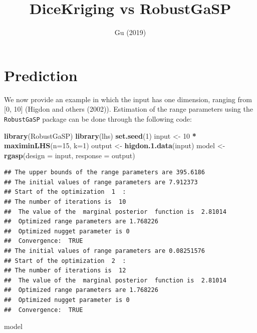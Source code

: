 \documentclass[
  10pt,
]{article}
\title{DiceKriging vs RobustGaSP}
\author{}
\date{\vspace{-2.5em}Gu (2019)}
\newenvironment{Shaded}{\begin{snugshade}}{\end{snugshade}}
\newcommand{\AttributeTok}[1]{\textcolor[rgb]{0.13,0.29,0.53}{#1}}
\newcommand{\DecValTok}[1]{\textcolor[rgb]{0.00,0.00,0.81}{#1}}
\newcommand{\FunctionTok}[1]{\textcolor[rgb]{0.13,0.29,0.53}{\textbf{#1}}}
\newcommand{\NormalTok}[1]{#1}
\newcommand{\OtherTok}[1]{\textcolor[rgb]{0.56,0.35,0.01}{#1}}
\newcommand{\SpecialCharTok}[1]{\textcolor[rgb]{0.81,0.36,0.00}{\textbf{#1}}}
\begin{document}
\maketitle

\section{Prediction}\label{prediction}

We now provide an example in which the input has one dimension, ranging
from {[}0, 10{]} (Higdon and others (2002)). Estimation of the range
parameters using the \texttt{RobustGaSP} package can be done through the
following code:

\begin{Shaded}
\begin{Highlighting}[]
\FunctionTok{library}\NormalTok{(RobustGaSP)}
\FunctionTok{library}\NormalTok{(lhs)}
\FunctionTok{set.seed}\NormalTok{(}\DecValTok{1}\NormalTok{)}
\NormalTok{input }\OtherTok{\textless{}{-}} \DecValTok{10} \SpecialCharTok{*} \FunctionTok{maximinLHS}\NormalTok{(}\AttributeTok{n=}\DecValTok{15}\NormalTok{, }\AttributeTok{k=}\DecValTok{1}\NormalTok{)}
\NormalTok{output }\OtherTok{\textless{}{-}} \FunctionTok{higdon.1.data}\NormalTok{(input)}
\NormalTok{model }\OtherTok{\textless{}{-}} \FunctionTok{rgasp}\NormalTok{(}\AttributeTok{design =}\NormalTok{ input, }\AttributeTok{response =}\NormalTok{ output)}
\end{Highlighting}
\end{Shaded}

\begin{verbatim}
## The upper bounds of the range parameters are 395.6186 
## The initial values of range parameters are 7.912373 
## Start of the optimization  1  : 
## The number of iterations is  10 
##  The value of the  marginal posterior  function is  2.81014 
##  Optimized range parameters are 1.768226 
##  Optimized nugget parameter is 0 
##  Convergence:  TRUE 
## The initial values of range parameters are 0.08251576 
## Start of the optimization  2  : 
## The number of iterations is  12 
##  The value of the  marginal posterior  function is  2.81014 
##  Optimized range parameters are 1.768226 
##  Optimized nugget parameter is 0 
##  Convergence:  TRUE
\end{verbatim}

\begin{Shaded}
\begin{Highlighting}[]
\NormalTok{model}
\end{Highlighting}
\end{Shaded}
\end{document}
